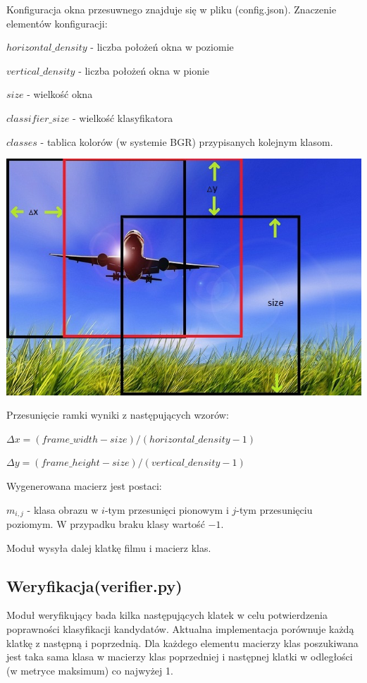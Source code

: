 \documentclass[10pt,a4paper]{article}
\begin{document}
Konfiguracja okna przesuwnego znajduje się w pliku (config.json). Znaczenie elementów konfiguracji:

$horizontal\_density$ - liczba położeń okna w poziomie

$vertical\_density$ - liczba położeń okna w pionie

$size$ - wielkość okna

$classifier\_size$ - wielkość klasyfikatora 

$classes$ - tablica kolorów (w systemie BGR) przypisanych kolejnym klasom.

\includegraphics[scale=0.8]{lot.jpg}

Przesunięcie ramki wyniki z następujących wzorów:

$\Delta x = (frame\_width- size)/(horizontal\_density-1)$

$\Delta y = (frame\_height - size)/(vertical\_density-1)$

Wygenerowana macierz jest postaci:

$m_{i,j}$ - klasa obrazu w $i$-tym przesunięci pionowym i $j$-tym przesunięciu poziomym. W przypadku braku klasy wartość $-1$.

Moduł wysyła dalej klatkę filmu i macierz klas.

\subsection{Weryfikacja(verifier.py)}

Moduł weryfikujący bada kilka następujących klatek w celu potwierdzenia poprawności klasyfikacji kandydatów. Aktualna implementacja porównuje każdą klatkę z następną i poprzednią. Dla każdego elementu macierzy klas poszukiwana jest taka sama klasa w macierzy klas poprzedniej i następnej klatki w odległości (w metryce maksimum) co najwyżej 1.
\end{document}
